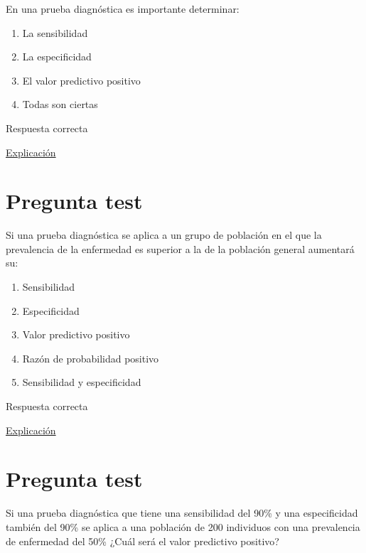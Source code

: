\documentclass[
]{book}
\providecommand{\tightlist}{%
  \setlength{\itemsep}{0pt}\setlength{\parskip}{0pt}}
\begin{document}
En una prueba diagnóstica es importante determinar:

\begin{enumerate}
\def\labelenumi{\alph{enumi})}
\tightlist
\item
  La sensibilidad
\item
  La especificidad
\item
  El valor predictivo positivo
\item
  Todas son ciertas
\end{enumerate}

Respuesta correcta

\href{https://1fjmanzano.github.io/bioestadistica/relaci\%C3\%B3n-entre-variables-cualitativas.html\#diagno\%CC\%81stico-cli\%CC\%81nico}{Explicación}

\hypertarget{pregunta-test-89}{%
\section{Pregunta test}\label{pregunta-test-89}}

Si una prueba diagnóstica se aplica a un grupo de población en el que la prevalencia de la enfermedad es superior a la de la población general aumentará su:

\begin{enumerate}
\def\labelenumi{\alph{enumi})}
\tightlist
\item
  Sensibilidad
\item
  Especificidad
\item
  Valor predictivo positivo
\item
  Razón de probabilidad positivo
\item
  Sensibilidad y especificidad
\end{enumerate}

Respuesta correcta

\href{https://1fjmanzano.github.io/bioestadistica/relaci\%C3\%B3n-entre-variables-cualitativas.html\#diagno\%CC\%81stico-cli\%CC\%81nico}{Explicación}

\hypertarget{pregunta-test-90}{%
\section{Pregunta test}\label{pregunta-test-90}}

Si una prueba diagnóstica que tiene una sensibilidad del 90\% y una especificidad también del 90\% se aplica a una población de 200 individuos con una prevalencia de enfermedad del 50\% ¿Cuál será el valor predictivo positivo?
\end{document}
